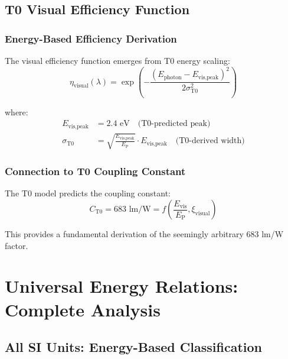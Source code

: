 \documentclass[12pt,a4paper]{article}
\newcommand{\xipar}{\xi}
\newcommand{\EP}{E_{\text{P}}}
\newcommand{\Evis}{E_{\text{vis}}}
\newcommand{\Cto}{C_{\text{T0}}}
\newcommand{\etavis}{\eta_{\text{visual}}}
\begin{document}
	\subsection{T0 Visual Efficiency Function}
	\label{subsec:t0_visual_efficiency}
	
	\subsubsection{Energy-Based Efficiency Derivation}
	\label{subsubsec:energy_efficiency_derivation}
	
	The visual efficiency function emerges from T0 energy scaling:
	\begin{equation}
		\etavis(\lambda) = \exp\left(-\frac{(E_{\text{photon}} - E_{\text{vis,peak}})^2}{2\sigma_{\text{T0}}^2}\right)
		\label{eq:t0_visual_efficiency}
	\end{equation}
	
	where:
	\begin{align}
		E_{\text{vis,peak}} &= 2.4 \text{ eV} \quad \text{(T0-predicted peak)} \\
		\sigma_{\text{T0}} &= \sqrt{\frac{E_{\text{vis,peak}}}{\EP}} \cdot E_{\text{vis,peak}} \quad \text{(T0-derived width)}
	\end{align}
	
	\subsubsection{Connection to T0 Coupling Constant}
	\label{subsubsec:t0_coupling_constant}
	
	The T0 model predicts the coupling constant:
	\begin{equation}
		\Cto = 683 \text{ lm/W} = f\left(\frac{\Evis}{\EP}, \xipar_{\text{visual}}\right)
		\label{eq:t0_coupling_prediction}
	\end{equation}
	
	This provides a fundamental derivation of the seemingly arbitrary 683 lm/W factor.
	
	\section{Universal Energy Relations: Complete Analysis}
	\label{sec:universal_energy_relations}
	
	\subsection{All SI Units: Energy-Based Classification}
	\label{subsec:all_si_energy_based}
	
\end{document}
